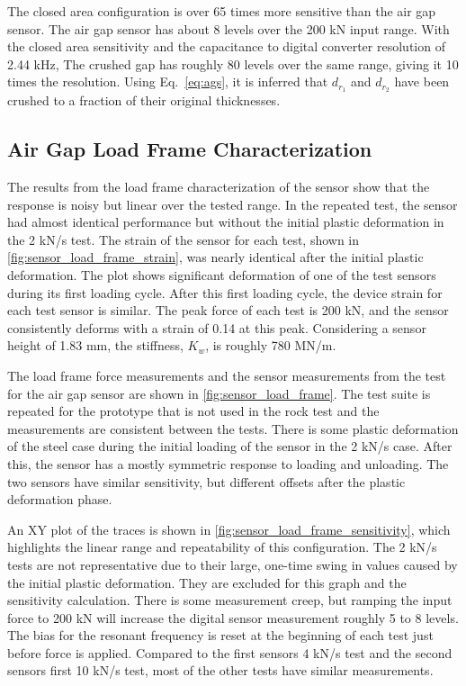 The closed area configuration is over 65 times more sensitive than the air gap sensor.
The air gap sensor has about 8 levels over the 200 kN input range.
With the closed area sensitivity and the capacitance to digital converter resolution of 2.44 kHz,
The crushed gap has roughly 80 levels over the same range, giving it 10 times the resolution.
Using Eq.~\ref{eq:ags}, 
it is inferred that $d_{r_1}$ and $d_{r_2}$ have been crushed to a fraction of their original thicknesses.

\subsection{Air Gap Load Frame Characterization}

The results from the load frame characterization of the sensor show that 
the response is noisy but linear over the tested range. 
In the repeated test, the sensor had almost identical performance but 
without the initial plastic deformation in the 2 kN/s test. 
The strain of the sensor for each test, shown in \ref{fig:sensor_load_frame_strain},
was nearly identical after the initial plastic deformation.
The plot shows significant deformation of one of the test sensors during its first loading cycle.
After this first loading cycle, the device strain for each test sensor is similar.
The peak force of each test is 200 kN, and the sensor 
consistently deforms with a strain of 0.14 at this peak.
Considering a sensor height of 1.83 mm, the stiffness, $K_w$, is roughly 780 MN/m.

The load frame force measurements and the sensor measurements 
from the test for the air gap sensor are shown in \ref{fig:sensor_load_frame}.
The test suite is repeated for the prototype that is not used in the rock test
 and the measurements are consistent between the tests.
There is some plastic deformation of the steel case during the initial loading of the sensor
in the 2 kN/s case. After this, the sensor has a mostly symmetric response to loading and unloading.
The two sensors have similar sensitivity, but different offsets after the plastic deformation phase.

An XY plot of the traces is shown in \ref{fig:sensor_load_frame_sensitivity}, 
which highlights the linear range and
repeatability of this configuration. 
The 2 kN/s tests are not representative due to their large, one-time swing in values 
caused by the initial plastic deformation. They are excluded for this graph and the 
sensitivity calculation.
There is some measurement creep, but ramping the input force to 200 kN
will increase the digital sensor measurement roughly 5 to 8 levels. 
The bias for the resonant frequency is reset at the beginning of each test just before
force is applied. 
Compared to the first sensors 4 kN/s test and the second sensors first 10 kN/s test,
most of the other tests have similar measurements.

